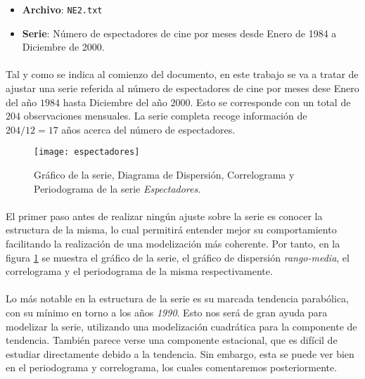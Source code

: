 \documentclass[a4paper, spanish]{article}
\begin{document}
  \maketitle

  \begin{itemize}
    \item \textbf{Archivo}: \texttt{NE2.txt}
    \item \textbf{Serie}: Número de espectadores de cine por meses desde Enero de 1984 a Diciembre de 2000.
  \end{itemize}

    \paragraph{}
    Tal y como se indica al comienzo del documento, en este trabajo se va a tratar de ajustar una serie referida al número de espectadores de cine por meses dese Enero del año $1984$ hasta Diciembre del año $2000$. Esto se corresponde con un total de $204$ observaciones mensuales. La serie completa recoge información de $204 / 12 = 17$ años acerca del número de espectadores.

    \begin{figure}[htb!]
      \texttt{[image: espectadores]}
      \caption{Gráfico de la serie, Diagrama de Dispersión, Correlograma y Periodograma de la serie \emph{Espectadores}.}
      \label{fig:espectadores}
    \end{figure}

    \paragraph{}
    El primer paso antes de realizar ningún ajuste sobre la serie es conocer la estructura de la misma, lo cual permitirá entender mejor su comportamiento facilitando la realización de una modelización más coherente. Por tanto, en la figura \ref{fig:espectadores} se muestra el gráfico de la serie, el gráfico de dispersión \emph{rango-media}, el correlograma y el periodograma de la misma respectivamente.

    \paragraph{}
    Lo más notable en la estructura de la serie es su marcada tendencia parabólica, con su mínimo en torno a los años \emph{1990}. Esto nos será de gran ayuda para modelizar la serie, utilizando una modelización cuadrática para la componente de tendencia. También parece verse una componente estacional, que es difícil de estudiar directamente debido a la tendencia. Sin embargo, esta se puede ver bien en el periodograma y correlograma, los cuales comentaremos posteriormente.
\end{document}
